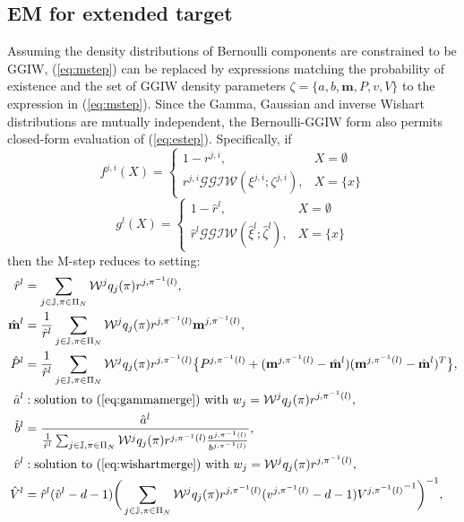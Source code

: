 \subsection{EM for extended target}
Assuming the density distributions of Bernoulli components are constrained to be GGIW, (\ref{eq:mstep}) can be replaced by expressions matching the probability of existence and the set of GGIW density parameters $\zeta = \{a,b,\mathbf{m},P,v,V\}$ to the expression in (\ref{eq:mstep}). Since the Gamma, Gaussian and inverse Wishart distributions are mutually independent, the Bernoulli-GGIW form also permits closed-form evaluation of (\ref{eq:estep}). Specifically, if
\begin{equation}
    f^{j,i}(X) = \begin{cases}
        1 - r^{j,i}, & X = \emptyset\\
        r^{j,i}\mathcal{GGIW}(\xi^{j,i};\zeta^{j,i}), & X = \{x\}
    \end{cases}
\end{equation}
\begin{equation}
    g^{l}(X) = \begin{cases}
        1 - \hat{r}^{l}, & X = \emptyset\\
        \hat{r}^{l}\mathcal{GGIW}(\hat{\xi}^{l};\hat{\zeta}^{l}), & X = \{x\}
    \end{cases}
\end{equation}
then the M-step reduces to setting:
\begin{subequations}
\begin{align}
    \hat{r}^{l} & = \sum_{j\in\mathbb{J},\pi\in\Pi_N}\mathcal{W}^jq_j(\pi)r^{j,\pi^{-1}(l)},\\
    \hat{\mathbf{m}}^{l} & = \frac{1}{\hat{r}^{l}}\sum_{j\in\mathbb{J},\pi\in\Pi_N}\mathcal{W}^jq_j(\pi)r^{j,\pi^{-1}(l)}\mathbf{m}^{j,\pi^{-1}(l)},\\
    \hat{P}^{l} & = \frac{1}{\hat{r}^{l}}\sum_{j\in\mathbb{J},\pi\in\Pi_N}\mathcal{W}^jq_j(\pi)r^{j,\pi^{-1}(l)}\big\{P^{j,\pi^{-1}(l)}+(\mathbf{m}^{j,\pi^{-1}(l)}-\hat{\mathbf{m}}^{l})(\mathbf{m}^{j,\pi^{-1}(l)}-\hat{\mathbf{m}}^{l})^T\big\},\\
    \hat{a}^l & : \text{solution to (\ref{eq:gammamerge}) with  } w_j=\mathcal{W}^jq_j(\pi)r^{j,\pi^{-1}(l)},\\
    \hat{b}^l & = \frac{\hat{a}^l}{\frac{1}{\hat{r}^{l}}\sum_{j\in\mathbb{J},\pi\in\Pi_N}\mathcal{W}^jq_j(\pi)r^{j,\pi^{-1}(l)}\frac{a^{j,\pi^{-1}(l)}}{b^{j,\pi^{-1}(l)}}},\\
    \hat{v}^l & : \text{solution to (\ref{eq:wishartmerge}) with  } w_j=\mathcal{W}^jq_j(\pi)r^{j,\pi^{-1}(l)},\\
    \hat{V}^l & = \hat{r}^{l}(\hat{v}^{l}-d-1)\bigg(\sum_{j\in\mathbb{J},\pi\in\Pi_N}\mathcal{W}^jq_j(\pi)r^{j,\pi^{-1}(l)}(v^{j,\pi^{-1}(l)}-d-1){V^{j,\pi^{-1}(l)}}^{-1}\bigg)^{-1},
\end{align}
\end{subequations}
